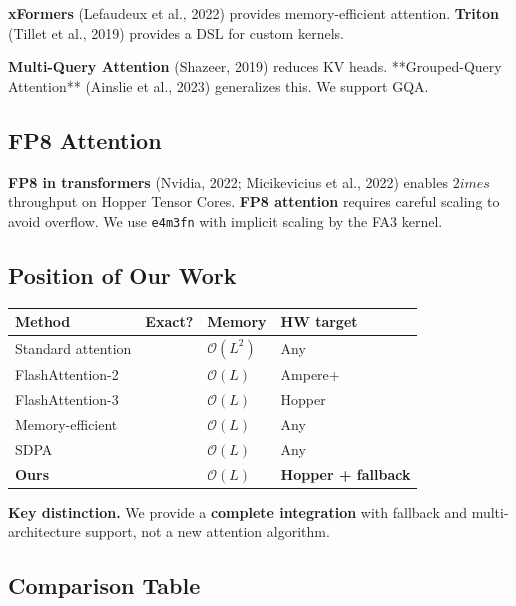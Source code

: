 \textbf{xFormers} (Lefaudeux et al., 2022) provides memory-efficient attention. 
\textbf{Triton} (Tillet et al., 2019) provides a DSL for custom kernels.

\textbf{Multi-Query Attention} (Shazeer, 2019) reduces KV heads. **Grouped-Query 
Attention** (Ainslie et al., 2023) generalizes this. We support GQA.

\subsection{FP8 Attention}

\textbf{FP8 in transformers} (Nvidia, 2022; Micikevicius et al., 2022) enables 
$2	imes$ throughput on Hopper Tensor Cores. \textbf{FP8 attention} requires 
careful scaling to avoid overflow. We use \texttt{e4m3fn} with implicit scaling 
by the FA3 kernel.

\subsection{Position of Our Work}

\begin{table}[H]
\centering
\small
\begin{tabular}{llll}
\toprule
\textbf{Method} & \textbf{Exact?} & \textbf{Memory} & \textbf{HW target} \\
\midrule
Standard attention &  & $\mathcal{O}(L^2)$ & Any \\
FlashAttention-2 &  & $\mathcal{O}(L)$ & Ampere+ \\
FlashAttention-3 &  & $\mathcal{O}(L)$ & Hopper \\
Memory-efficient &  & $\mathcal{O}(L)$ & Any \\
SDPA &  & $\mathcal{O}(L)$ & Any \\
\textbf{Ours} &  & $\mathcal{O}(L)$ & \textbf{Hopper + fallback} \\
\bottomrule
\end{tabular}
\end{table}

\textbf{Key distinction.} We provide a \textbf{complete integration} with fallback 
and multi-architecture support, not a new attention algorithm.



\subsection{Comparison Table}

